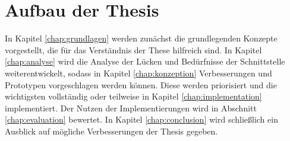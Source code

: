 \section{Aufbau der Thesis}

In Kapitel \ref{chap:grundlagen} werden zunächst die grundlegenden Konzepte vorgestellt, die für das Verständnis der These hilfreich sind.
In Kapitel \ref{chap:analyse} wird die Analyse der Lücken und Bedürfnisse der Schnittstelle weiterentwickelt, sodass in Kapitel \ref{chap:konzeption} Verbesserungen und Prototypen vorgeschlagen werden können.
Diese werden priorisiert und die wichtigsten vollständig oder teilweise in Kapitel \ref{chap:implementation} implementiert.
Der Nutzen der Implementierungen wird in Abschnitt \ref{chap:evaluation} bewertet.
In Kapitel \ref{chap:conclusion} wird schließlich ein Ausblick auf mögliche Verbesserungen der Thesis gegeben.
